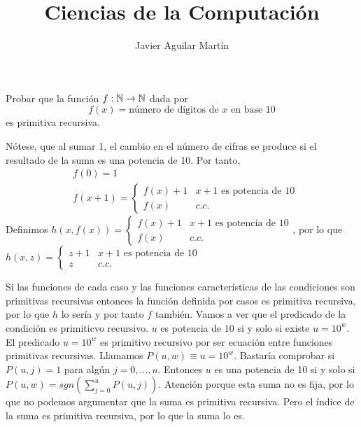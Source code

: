 \documentclass[twoside]{article}
\begin{document}
\title{Ciencias de la Computación}

\author{Javier Aguilar Martín}
\maketitle

\begin{ejercicio}{6}
Probar que la función $f:\mathbb{N}\to\mathbb{N}$ dada por $$f(x)=\text{número de dígitos de }x\text{ en base }10$$ es primitiva recursiva.
\end{ejercicio}
\begin{solucion}
Nótese, que al sumar 1, el cambio en el número de cifras se produce si el resultado de la suma es una potencia de 10. Por tanto, 
\begin{align*}
&f(0)=1\\
&f(x+1)=\begin{cases}
f(x)+1 & x+1\text{ es potencia de } 10\\
f(x) & c.c.
\end{cases}
\end{align*}
Definimos $h(x,f(x))=\begin{cases}
f(x)+1 & x+1\text{ es potencia de } 10\\
f(x) & c.c.
\end{cases}$, por lo que $h(x,z)=\begin{cases}
z+1 & x+1\text{ es potencia de } 10\\
z & c.c.
\end{cases}$

Si las funciones de cada caso y las funciones características de las condiciones son primitivas recursivas entonces la función definida por casos es primitiva recursiva, por lo que $h$ lo sería y por tanto $f$ también. Vamos a ver que el predicado de la condición es primiticvo recursivo. $u$ es potencia de $10$ si y solo si existe $u=10^w$. El predicado $u=10^w$ es primitivo recursivo por ser ecuación entre funciones primitivas recursivas. Llamamos $P(u,w)\equiv u=10^w$. Bastaría comprobar si $P(u,j)=1$ para algún $j=0,\dots, u$. Entonces $u$ es una potencia de 10 si y solo si $P(u,w)=sgn(\sum_{j=0}^u P(u,j))$. Atención porque esta suma no es fija, por lo que no podemos argumentar que la suma es primitiva recursiva. Pero el índice de la suma es primitiva recursiva, por lo que la suma lo es.
\end{solucion}

\newpage
\end{document}
